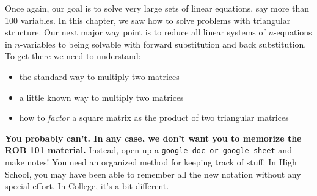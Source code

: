 Once again, our goal is to solve very large sets of linear equations, say more than 100 variables. In this chapter, we saw how to solve problems with triangular structure. Our next major way point is to reduce all linear systems of $n$-equations in $n$-variables to being solvable with forward substitution and back substitution. To get there we need to understand:
\begin{itemize}
\item the standard way to multiply two matrices
\item a little known way to multiply two matrices
    \item how to \textit{factor} a square matrix as the product of two triangular matrices
\end{itemize}

 \vspace*{.5cm}
\begin{tcolorbox}[title={\large \textcolor{red}{\bf  Help! Help! } \textbf{ How am I supposed to remember all of this?}}]
 
\textbf{ You probably can't. In any case, we don't want you to memorize the ROB 101 material.} Instead, open up a \texttt{google doc or google sheet} and make notes! You need an organized method for keeping track of stuff. In High School, you may have been able to remember all the new notation without any special effort. In College, it's a bit different.
 
 \end{tcolorbox}